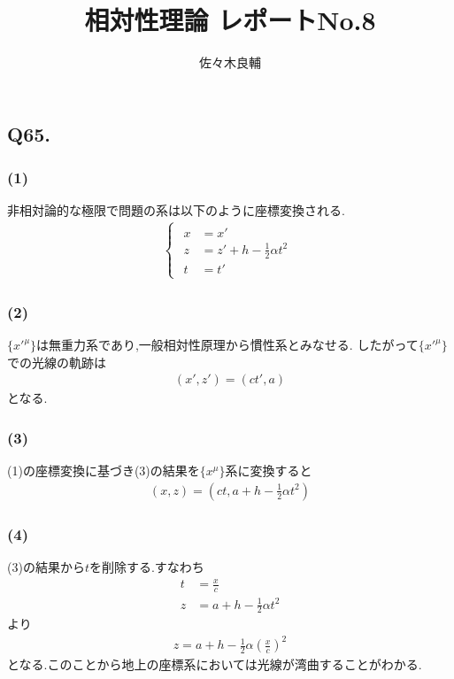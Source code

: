 \documentclass[uplatex,a4j,11pt,dvipdfmx]{jsarticle}
\begin{document}
\title{相対性理論 レポートNo.8}
\author{佐々木良輔}
\date{}
\maketitle
\subsection*{Q65.}
\subsubsection*{(1)}
非相対論的な極限で問題の系は以下のように座標変換される.
\begin{align}
  \begin{cases}
    \begin{split}
      x&=x'\\
      z&=z'+h-\frac{1}{2}\alpha t^2\\
      t&=t'
    \end{split}
  \end{cases}
\end{align}
\subsubsection*{(2)}
$\{x'^\mu\}$は無重力系であり,一般相対性原理から慣性系とみなせる.
したがって$\{x'^\mu\}$での光線の軌跡は
\begin{align}
  (x',z')=(ct',a)
\end{align}
となる.
\subsubsection*{(3)}
(1)の座標変換に基づき(3)の結果を$\{x^\mu\}$系に変換すると
\begin{align}
  (x,z)=(ct, a+h-\frac{1}{2}\alpha t^2)
\end{align}
\subsubsection*{(4)}
(3)の結果から$t$を削除する.すなわち
\begin{align}
  t&=\frac{x}{c}\\
  z&=a+h-\frac{1}{2}\alpha t^2
\end{align}
より
\begin{align}
  z=a+h-\frac{1}{2}\alpha\left(\frac{x}{c}\right)^2
\end{align}
となる.このことから地上の座標系においては光線が湾曲することがわかる.
\end{document}
